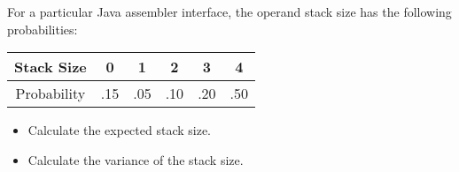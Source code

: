 \begin{frame}
For a particular Java assembler interface, the operand stack size has the
following probabilities:
\begin{tabular}{|c||c|c|c|c|c|}
  \hline
  Stack Size  & 0 & 1 & 2 & 3 & 4 \\ \hline
 Probability & .15 & .05 & .10 &.20 &.50\\
  \hline
\end{tabular}
\begin{itemize}
\item Calculate the expected stack size.
\item Calculate the variance of the stack size.
\end{itemize}
\end{frame}

